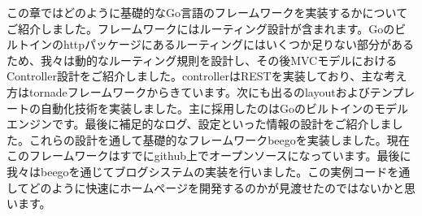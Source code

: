この章ではどのように基礎的なGo言語のフレームワークを実装するかについてご紹介しました。フレームワークにはルーティング設計が含まれます。Goのビルトインのhttpパッケージにあるルーティングにはいくつか足りない部分があるため、我々は動的なルーティング規則を設計し、その後MVCモデルにおけるController設計をご紹介しました。controllerはRESTを実装しており、主な考え方はtornadeフレームワークからきています。次にも出るのlayoutおよびテンプレートの自動化技術を実装しました。主に採用したのはGoのビルトインのモデルエンジンです。最後に補足的なログ、設定といった情報の設計をご紹介しました。これらの設計を通して基礎的なフレームワークbeegoを実装しました。現在このフレームワークはすでにgithub上でオープンソースになっています。最後に我々はbeegoを通じてブログシステムの実装を行いました。この実例コードを通してどのように快速にホームページを開発するのかが見渡せたのではないかと思います。
